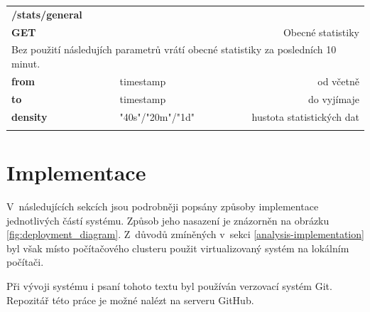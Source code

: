 \documentclass[thesis=B,czech]{FITthesis}[2012/06/26]
\begin{document}
\begin{table}[h]
\begin{tabular}{llllr}
\rowcolor[HTML]{EFEFEF}
\large \textbf{/stats/general}        &         &                 &        & \multicolumn{1}{l}{}                \\
\rowcolor[HTML]{EFEFEF}
\textbf{GET}          &         &                 &        & Obecné statistiky                        \\
\multicolumn{5}{l}{\parbox[t]{12.8cm}{Bez použití následujích parametrů vrátí obecné statistiky za posledních 10 minut.  }  } \\
\textbf{from}         &         & timestamp       &        & od včetně                           \\
\textbf{to}           &         & timestamp       &        & do vyjímaje                         \\
\textbf{density}        &         & "40s"/"20m"/"1d"         &        & hustota statistických dat   \\
 & & & & \\
\end{tabular}
\end{table}



\chapter{Implementace}
\label{implementace}
V~následujících sekcích jsou podrobněji popsány způsoby implementace jednotlivých částí systému. Způsob jeho nasazení je znázorněn na obrázku \ref{fig:deployment_diagram}. Z~důvodů zmíněných v~sekci \ref{analysis-implementation} byl však místo počítačového clusteru použit virtualizovaný systém na lokálním počítači. 

Při vývoji systému i psaní tohoto textu byl používán verzovací systém Git. Repozitář této práce je možné nalézt na serveru GitHub\cite{github}. 
\end{document}
